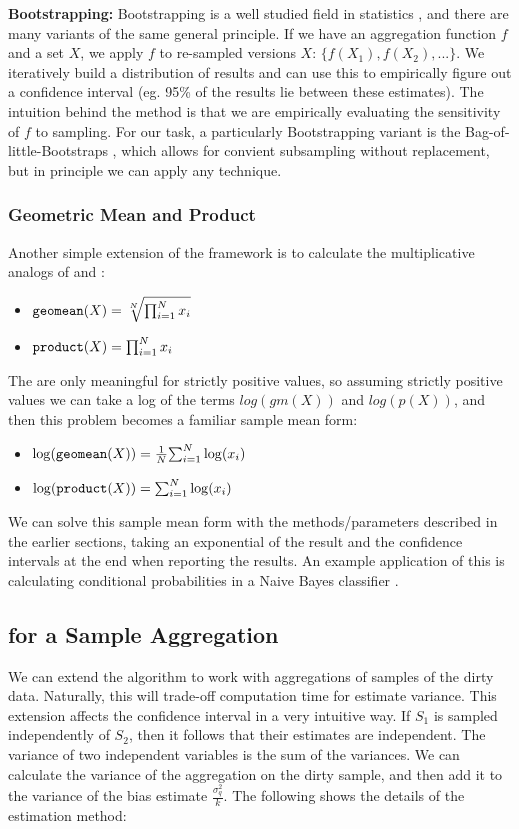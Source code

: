 {\noindent \bf Bootstrapping:}
Bootstrapping is a well studied field in statistics \cite{hinkley1988bootstrap}, and there are many variants of the same general principle.
If we have an aggregation function $f$ and a set $X$, we apply $f$ to re-sampled versions $X$: $\{f(X_1),f(X_2),...\}$.
We iteratively build a distribution of results and can use this to empirically figure out a confidence interval (eg. 95\% of the results lie between these estimates).
The intuition behind the method is that we are empirically evaluating the sensitivity of $f$ to sampling.
For our task, a particularly Bootstrapping variant is the Bag-of-little-Bootstraps \cite{kleiner2011scalable}, which allows for convient subsampling without replacement, but in principle we can apply any technique.

\subsubsection{Geometric Mean and Product}
Another simple extension of the framework is to calculate the multiplicative analogs of \avgfunc and \sumfunc:
\begin{itemize}\vspace{-.5em}
\item $\texttt{geomean} (X) = \sqrt[N]{\prod_{i=1}^Nx_i}$
\item $\texttt{product} (X) = \prod_{i=1}^Nx_i$
\end{itemize}
The  are only meaningful for strictly positive values, so assuming strictly positive values we can take a log of the terms $log(gm(X))$ and $log(p(X))$, and then this
problem becomes a familiar sample mean form:
\begin{itemize}\vspace{-.5em}
\item $\log(\texttt{geomean} (X)) = \frac{1}{N}{\sum_{i=1}^N\log(x_i)}$
\item $\log(\texttt{product} (X)) = {\sum_{i=1}^N\log(x_i)}$
\end{itemize}
We can solve this sample mean form with the methods/parameters described in the earlier sections, taking an exponential of the result and the confidence intervals at the end
when reporting the results.
An example application of this is calculating conditional probabilities in a Naive Bayes classifier \cite{jordan2002discriminative}.

\subsection{\bias for a Sample Aggregation}\label{app:ext2}
We can extend the \bias algorithm to work with aggregations of samples of the dirty data.
Naturally, this will trade-off computation time for estimate variance.
This extension affects the confidence interval in a very intuitive way.
If $S_1$ is sampled independently of $S_2$, then it follows that their estimates are independent.
The variance of two independent variables is the sum of the variances.
We can calculate the variance of the aggregation on the dirty sample, and then add it to the variance of the bias estimate $\frac{\sigma_q^2}{k}$. The following shows the details of the estimation method:

